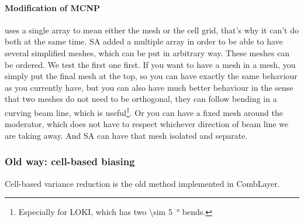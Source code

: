 \paragraph{Modification of MCNP}
\mcnp uses a single array to mean either the mesh or the cell grid, that's why it can't do both at the same time.
SA added a multiple array in order to be able to have several simplified meshes, which can be put in arbitrary way.
These meshes can be ordered.
We test the first one first. If you want to have a mesh in a mesh, you simply put the final mesh at the top,
so you can have exactly the same behaviour as you currently have, but you can also have much better behaviour in the sense
that two meshes do not need to be orthogonal, they can follow bending in a curving beam line, which is useful\footnote{Especially for LOKI, which has two \SI{\sim 5}{\degree} bends.}.
Or you can have a fixed mesh around the moderator, which does not have to respect whichever direction of beam line we are taking away.
And SA can have that mesh isolated and separate.

\subsubsection{Old way: cell-based biasing}
\label{sec:vr:cadis:cell}
Cell-based variance reduction is the old method implemented in CombLayer.



